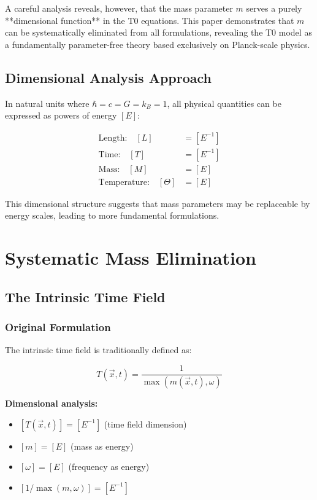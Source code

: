 \documentclass[12pt,a4paper]{article}
\newcommand{\Tfieldt}{T(\vec{x},t)}
\newcommand{\vecx}{\vec{x}}
\begin{document}
	A careful analysis reveals, however, that the mass parameter $m$ serves a purely **dimensional function** in the T0 equations. This paper demonstrates that $m$ can be systematically eliminated from all formulations, revealing the T0 model as a fundamentally parameter-free theory based exclusively on Planck-scale physics.
	
	\subsection{Dimensional Analysis Approach}
	\label{subsec:dimensional_approach}
	
	In natural units where $\hbar = c = G = k_B = 1$, all physical quantities can be expressed as powers of energy $[E]$:
	
	\begin{align}
		\text{Length:} \quad [L] &= [E^{-1}] \\
		\text{Time:} \quad [T] &= [E^{-1}] \\
		\text{Mass:} \quad [M] &= [E] \\
		\text{Temperature:} \quad [\Theta] &= [E]
	\end{align}
	
	This dimensional structure suggests that mass parameters may be replaceable by energy scales, leading to more fundamental formulations.
	
	\section{Systematic Mass Elimination}
	\label{sec:mass_elimination}
	
	\subsection{The Intrinsic Time Field}
	\label{subsec:time_field_elimination}
	
	\subsubsection{Original Formulation}
	
	The intrinsic time field is traditionally defined as:
	
	\begin{equation}
		\Tfieldt = \frac{1}{\max(m(\vecx,t), \omega)}
		\label{eq:time_field_original}
	\end{equation}
	
	\textbf{Dimensional analysis:}
	\begin{itemize}
		\item $[\Tfieldt] = [E^{-1}]$ (time field dimension)
		\item $[m] = [E]$ (mass as energy)
		\item $[\omega] = [E]$ (frequency as energy)
		\item $[1/\max(m,\omega)] = [E^{-1}]$ \checkmark
	\end{itemize}
	
\end{document}
